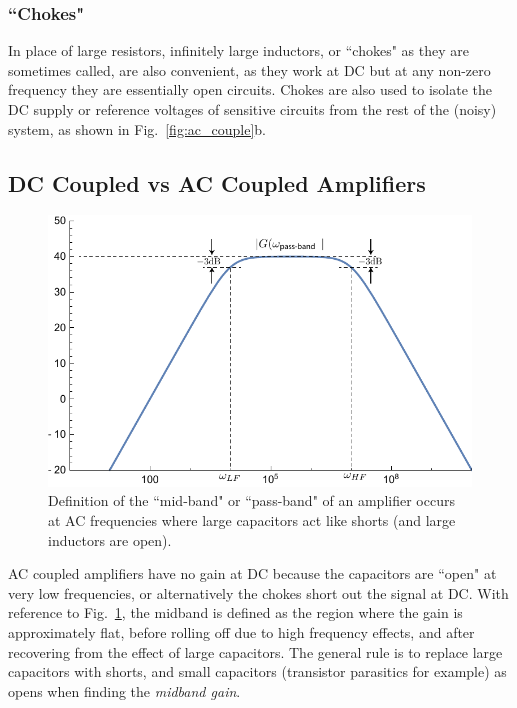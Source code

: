 \subsubsection{``Chokes"}
In place of large resistors, infinitely large inductors, or ``chokes" as they are sometimes called, are also convenient, as they work at DC but at any non-zero frequency they are essentially open circuits.  Chokes are also used to isolate the DC supply or reference voltages of sensitive circuits from the rest of the (noisy) system, as shown in Fig.~\ref{fig:ac_couple}b.
\subsection{DC Coupled vs AC Coupled Amplifiers}
\begin{figure}[tb]
\centering
\includegraphics[width=.6\columnwidth]{amp_bandpass}
\caption{Definition of the ``mid-band" or ``pass-band" of an amplifier occurs at AC frequencies where large capacitors act like shorts (and large inductors are open).}
\label{fig:midband}
\end{figure}
AC coupled amplifiers have no gain at DC because the capacitors are ``open" at very low frequencies, or alternatively the chokes short out the signal at DC.  With reference to Fig.~\ref{fig:midband}, the midband is defined as the region where the gain is approximately flat, before rolling off due to high frequency effects, and after recovering from the effect of large capacitors. The general rule is to replace large capacitors with shorts, and small capacitors (transistor parasitics for example) as opens when finding the \emph{midband gain}. 
